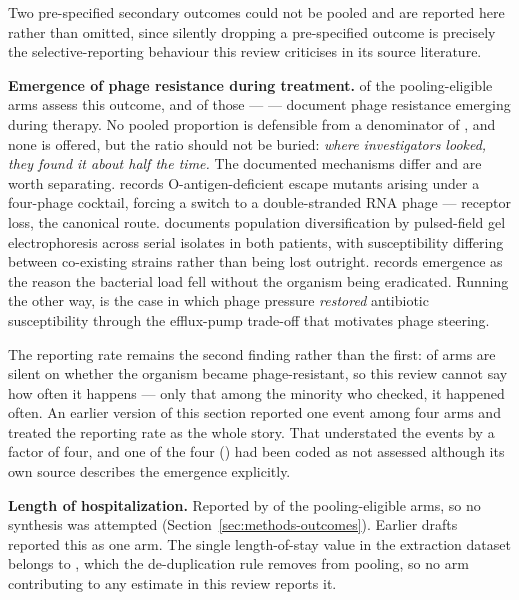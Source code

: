 Two pre-specified secondary outcomes could not be pooled and are reported here rather than omitted, since silently dropping a pre-specified outcome is precisely the selective-reporting behaviour this review criticises in its source literature.

\textbf{Emergence of phage resistance during treatment.} \ResistEmergenceReported of the \ArmsAnalysed pooling-eligible arms assess this outcome, and \ResistEmergenceEvents of those \ResistEmergenceReported  --- \ResistEmergenceEventPct  --- document phage resistance emerging during therapy. No pooled proportion is defensible from a denominator of \ResistEmergenceReported , and none is offered, but the ratio should not be buried: \emph{where investigators looked, they found it about half the time.} The documented mechanisms differ and are worth separating. \textcite{Li2025_hlife_biliary} records O-antigen-deficient escape mutants arising under a four-phage cocktail, forcing a switch to a double-stranded RNA phage --- receptor loss, the canonical route. \textcite{Zaldastanishvili2021_viruses} documents population diversification by pulsed-field gel electrophoresis across serial isolates in both patients, with susceptibility differing between co-existing strains rather than being lost outright. \textcite{Yang2025_scirep} records emergence as the reason the bacterial load fell without the organism being eradicated. Running the other way, \textcite{Chan2018_omko1_emph} is the case in which phage pressure \emph{restored} antibiotic susceptibility through the efflux-pump trade-off that motivates phage steering.

The reporting rate remains the second finding rather than the first: \ResistEmergenceSilent of \ArmsAnalysed arms are silent on whether the organism became phage-resistant, so this review cannot say how often it happens --- only that among the minority who checked, it happened often. An earlier version of this section reported one event among four arms and treated the reporting rate as the whole story. That understated the events by a factor of four, and one of the four (\citeauthor{Yang2025_scirep}) had been coded as not assessed although its own source describes the emergence explicitly.

\textbf{Length of hospitalization.} Reported by \LosReported of the \ArmsAnalysed pooling-eligible arms, so no synthesis was attempted (Section~\ref{sec:methods-outcomes}). Earlier drafts reported this as one arm. The single length-of-stay value in the extraction dataset belongs to \citeauthor{Racenis2023_viruses}, which the de-duplication rule removes from pooling, so no arm contributing to any estimate in this review reports it.

